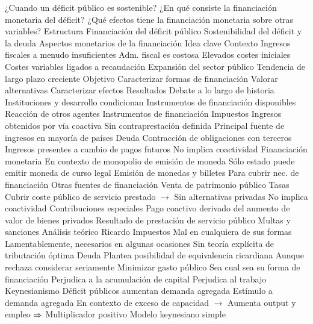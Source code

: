 \documentclass{nuevotema}
\begin{document}
\begin{esquemal}
			\3 ¿Cuando un déficit público es sostenible?
			\3 ¿En qué consiste la financiación monetaria del déficit?
			\3 ¿Qué efectos tiene la financiación monetaria sobre otras variables?
		\2 Estructura
			\3 Financiación del déficit público
			\3 Sostenibilidad del déficit y la deuda
			\3 Aspectos monetarios de la financiación
	\1 
		\2 Idea clave
			\3 Contexto
				\4 Ingresos fiscales a menudo insuficientes
				\4 Adm. fiscal es costosa
				\4[] Elevados costes iniciales
				\4[] Costes variables ligados a recaudación
				\4 Expansión del sector público
				\4[] Tendencia de largo plazo creciente
			\3 Objetivo
				\4 Caracterizar formas de financiación
				\4 Valorar alternativas
				\4 Caracterizar efectos
			\3 Resultados
				\4 Debate a lo largo de historia
				\4 Instituciones y desarrollo condicionan
				\4[] Instrumentos de financiación disponibles
				\4[] Reacción de otros agentes
		\2 Instrumentos de financiación
			\3 Impuestos
				\4 Ingresos obtenidos por vía coactiva
				\4 Sin contraprestación definida
				\4 Principal fuente de ingresos en mayoría de países
			\3 Deuda
				\4 Contracción de obligaciones con terceros
				\4 Ingresos presentes a cambio de pagos futuros
				\4 No implica coactividad
			\3 Financiación monetaria
				\4 En contexto de monopolio de emisión de moneda
				\4[] Sólo estado puede emitir moneda de curso legal
				\4 Emisión de monedas y billetes
				\4[] Para cubrir nec. de financiación
			\3 Otras fuentes de financiación
				\4 Venta de patrimonio público
				\4 Tasas
				\4[] Cubrir coste público de servicio prestado
				\4[] $\to$ Sin alternativas privadas
				\4[] No implica coactividad
				\4 Contribuciones especiales
				\4[] Pago coactivo derivado del aumento de valor de bienes privados
				\4[] Resultado de prestación de servicio público
				\4 Multas y sanciones
		\2 Análisis teórico
			\3 Ricardo
				\4 Impuestos
				\4[] Mal en cualquiera de sus formas
				\4[] Lamentablemente, necesarios en algunas ocasiones
				\4[] Sin teoría explícita de tributación óptima
				\4 Deuda
				\4[] Plantea posibilidad de equivalencia ricardiana
				\4[] Aunque rechaza considerar seriamente
				\4 Minimizar gasto público
				\4[] Sea cual sea su forma de financiación
				\4[] Perjudica a la acumulación de capital
				\4[] Perjudica al trabajo
			\3 Keynesianismo
				\4 Déficit públicos aumentan demanda agregada
				\4 Estímulo a demanda agregada
				\4[] En contexto de exceso de capacidad
				\4[] $\to$ Aumenta output y empleo
				\4[] $\Rightarrow$ Multiplicador positivo
				\4 Modelo keynesiano simple

\end{esquemal}
\end{document}
